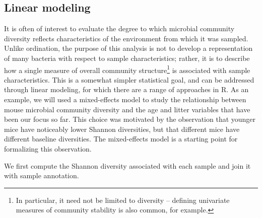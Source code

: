 \subsection*{Linear modeling}

It is often of interest to evaluate the degree to which microbial community diversity
reflects characteristics of the environment from which it
was sampled. Unlike ordination, the purpose of this analysis is not to
develop a representation of many bacteria with respect
to sample characteristics; rather, it is to describe how a single
measure of overall community structure\footnote{In particular, it need
  not be limited to diversity -- defining univariate measures of
  community stability is also common, for example.} is associated with
sample characteristics. This is a somewhat simpler statistical goal,
and can be addressed through linear modeling, for which there are a
range of approaches in R. As an example, we will used a mixed-effects
model to study the relationship between mouse microbial community
diversity and the age and litter variables that have been our focus so
far. This choice was motivated by the observation that younger
mice have noticeably lower Shannon diversities, but that different
mice have different baseline diversities. The mixed-effects model is a
starting point for formalizing this observation.

We first compute the Shannon diversity associated with each sample
and join it with sample annotation.


